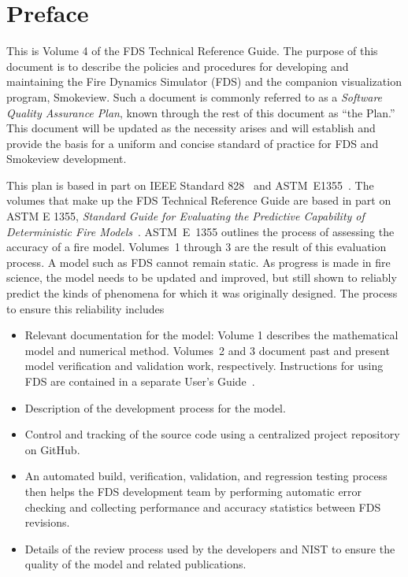 \documentclass[11pt]{book}
\begin{document}
\pagestyle{plain}




\chapter{Preface}

This is Volume 4 of the FDS Technical Reference Guide. The purpose of this document is to describe the policies and procedures for developing and maintaining the Fire Dynamics
Simulator (FDS) and the companion visualization program, Smokeview. Such a document is commonly referred to as a {\em Software Quality Assurance Plan}, known through the rest of this document as ``the Plan.'' This document will be updated as the necessity arises and will establish and provide the basis for a uniform and concise standard of practice for FDS and Smokeview development.

This plan is based in part on IEEE Standard 828~\cite{IEEE-828} and ASTM~E1355~\cite{ASTM:E1355}. The volumes that make up the FDS Technical Reference Guide are based in part on ASTM E 1355, {\em Standard Guide for Evaluating the Predictive Capability of
Deterministic Fire Models}~\cite{ASTM:E1355}. ASTM~E~1355 outlines the process of assessing the accuracy of a fire model. Volumes~1 through 3 are the result of this evaluation process. A model such as FDS cannot remain static. As progress is made in fire science, the model needs to be updated and improved, but still shown to reliably predict the kinds of phenomena for which it was originally designed. The process to ensure this reliability includes

\begin{itemize}
    \item Relevant documentation for the model: Volume 1 describes the mathematical model and numerical method. Volumes~2 and 3 document past and present model verification and validation work, respectively. Instructions for using FDS are contained in a separate User's Guide~\cite{FDS_Users_Guide}.

    \item Description of the development process for the model.

    \item Control and tracking of the source code using a centralized project repository on GitHub.

    \item An automated build, verification, validation, and regression testing process then helps the FDS development team by performing automatic error checking and collecting performance and accuracy statistics between FDS revisions.

    \item Details of the review process used by the developers and NIST to ensure the quality of the model and related publications.

\end{itemize}
\end{document}
